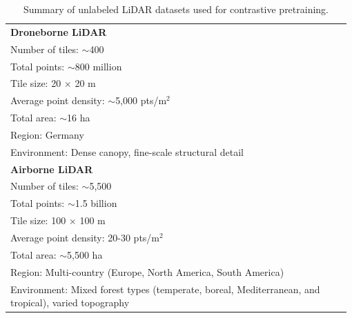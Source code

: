 \documentclass[review,authoryear]{elsarticle}
\begin{document}
\begin{table}[htbp]
\centering
\caption{Summary of unlabeled LiDAR datasets used for contrastive pretraining.}
\label{tab:unlabeled_data}
\begin{tabular}{p{0.98\linewidth}}
\toprule
\textbf{Droneborne LiDAR} \\
\hspace{1em}Number of tiles: $\sim$400 \\
\hspace{1em}Total points: $\sim$800 million \\
\hspace{1em}Tile size: 20 $\times$ 20 m \\
\hspace{1em}Average point density: $\sim$5,000 pts/m$^2$ \\
\hspace{1em}Total area: $\sim$16 ha \\
\hspace{1em}Region: Germany \\
\hspace{1em}Environment: Dense canopy, fine-scale structural detail \\
\textbf{Airborne LiDAR} \\
\hspace{1em}Number of tiles: $\sim$5,500 \\
\hspace{1em}Total points: $\sim$1.5 billion \\
\hspace{1em}Tile size: 100 $\times$ 100 m \\
\hspace{1em}Average point density: 20-30 pts/m$^2$ \\
\hspace{1em}Total area: $\sim$5,500 ha \\
\hspace{1em}Region: Multi-country (Europe, North America, South America) \\
\hspace{1em}Environment: Mixed forest types (temperate, boreal, Mediterranean, and tropical), varied topography \\
\bottomrule
\end{tabular}
\end{table}

\end{document}
